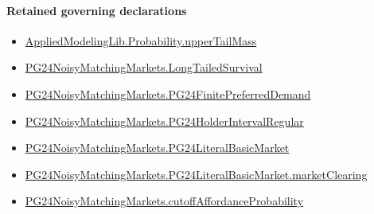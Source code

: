 \documentclass[10pt]{article}
\begin{document}
\paragraph{Retained governing declarations}
\begin{itemize}\raggedright
\item \hyperlink{governing-declaration-f983ca9c59dc317f}{Applied\allowbreak{}Modeling\allowbreak{}Lib.\allowbreak{}Probability.\allowbreak{}upper\allowbreak{}Tail\allowbreak{}Mass}
\item \hyperlink{governing-declaration-e6c10c02961c0451}{PG24\allowbreak{}Noisy\allowbreak{}Matching\allowbreak{}Markets.\allowbreak{}Long\allowbreak{}Tailed\allowbreak{}Survival}
\item \hyperlink{governing-declaration-5abddabcc3314102}{PG24\allowbreak{}Noisy\allowbreak{}Matching\allowbreak{}Markets.\allowbreak{}PG24\allowbreak{}Finite\allowbreak{}Preferred\allowbreak{}Demand}
\item \hyperlink{governing-declaration-34ba25842cf90e86}{PG24\allowbreak{}Noisy\allowbreak{}Matching\allowbreak{}Markets.\allowbreak{}PG24\allowbreak{}Holder\allowbreak{}Interval\allowbreak{}Regular}
\item \hyperlink{paper-prerequisite-c7f1778ccec10a69}{PG24\allowbreak{}Noisy\allowbreak{}Matching\allowbreak{}Markets.\allowbreak{}PG24\allowbreak{}Literal\allowbreak{}Basic\allowbreak{}Market}
\item \hyperlink{governing-declaration-61d8d4911d878de6}{PG24\allowbreak{}Noisy\allowbreak{}Matching\allowbreak{}Markets.\allowbreak{}PG24\allowbreak{}Literal\allowbreak{}Basic\allowbreak{}Market.\allowbreak{}market\allowbreak{}Clearing}
\item \hyperlink{governing-declaration-a4a2a08d89f647e4}{PG24\allowbreak{}Noisy\allowbreak{}Matching\allowbreak{}Markets.\allowbreak{}cutoff\allowbreak{}Affordance\allowbreak{}Probability}
\end{itemize}
\end{document}
